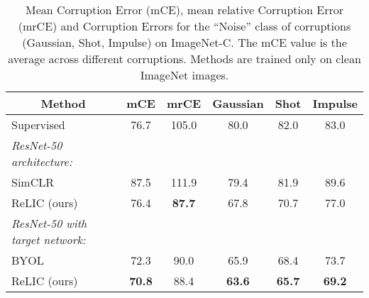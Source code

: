 \documentclass{article}
\begin{document}
 
\begin{table}[ht]
\caption{Mean Corruption Error (mCE), mean relative Corruption Error (mrCE) and Corruption Errors for the ``Noise'' class of corruptions (Gaussian, Shot, Impulse) on ImageNet-C. The mCE value is the average across  different corruptions. Methods are trained only on clean ImageNet images.}
\label{table.imagenet_c}
\begin{center}
\begin{tabular}{lccccc}
\hline
\multicolumn{1}{c}{Method} & \multicolumn{1}{c}{mCE}  & \multicolumn{1}{c}{mrCE} & \multicolumn{1}{c}{Gaussian} & \multicolumn{1}{c}{Shot} & \multicolumn{1}{c}{Impulse} \\
\hline
Supervised &  76.7 & 105.0 & 80.0 & 82.0 & 83.0\\
\emph{ResNet-50 architecture:} \\
\quad SimCLR  &  87.5 & 111.9 & 79.4& 81.9& 89.6\\
\quad ReLIC (ours) &    76.4 & {\bf 87.7} & 67.8& 70.7& 77.0 \\
\emph{ResNet-50 with target network:} & & & \\
\quad BYOL  &  72.3 & 90.0 & 65.9& 68.4& 73.7 \\ 
\quad ReLIC (ours) &  {\bf 70.8} & 88.4 & {\bf 63.6} & {\bf 65.7} & {\bf 69.2}\\ 
\hline
\end{tabular}
\end{center}
\end{table}
\end{document}

